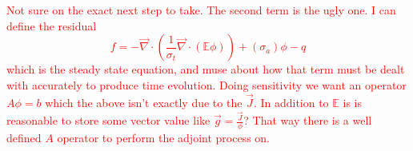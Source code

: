 \documentclass[12pt]{report}
\renewcommand{\div}{\vec{\nabla} \cdot}
\newcommand{\Edd}{\mathbb{E}}
\newcommand{\sigt}{\sigma_t}
\newcommand{\siga}{\sigma_a}
\newcommand{\scalSource}{q}
\newcommand{\comment}[2]{\marginpar{\textcolor{#2}{$\star$}}\textcolor{#2}{#1}\newline}
\newcommand{\iwh}[1]{\comment{#1}{red}}
\newcommand{\iwh}[1]{\phantom{a}}
\begin{document}
\begin{appendices}
\iwh{Not sure on the exact next step to take. The second term is the ugly one. I can define the residual 
\begin{equation}
f=- \div \left( \frac{1}{\sigt} \div \left( \Edd \phi \right) \right)  + (\siga) \phi - \scalSource
\end{equation}
which is the steady state equation, and muse about how that term must be dealt with accurately to produce time evolution. 
Doing sensitivity we want an operator $A \phi = b$ which the above isn't exactly due to the $\vec{J}$. In addition to $\Edd$ is is reasonable to store some vector value like $\vec{g}=\frac{\vec{J}}{\phi}$? That way there is a well defined $A$ operator to perform the adjoint process on.}


\end{appendices}
\end{document}
